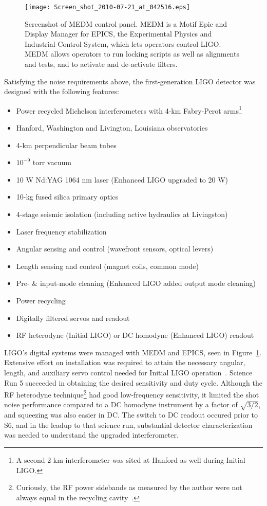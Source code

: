 	\begin{figure}
	\begin{center}
	\texttt{[image: Screen\_shot\_2010-07-21\_at\_042516.eps]}
	\caption{Screenshot of MEDM control panel. MEDM is a Motif Epic and Display Manager for EPICS, the Experimental Physics and Industrial Control System, which lets operators control LIGO. MEDM allows operators to run locking scripts as well as alignments and tests, and to activate and de-activate filters.}
	\label{ScreenshotMEDM}
	\end{center}
	\end{figure}

Satisfying the noise requirements above, the first-generation LIGO detector was designed with the following features:

\begin{itemize}
\item Power recycled Michelson interferometers with 4-km Fabry-Perot arms\footnote{A second 2-km interferometer was sited at Hanford as well during Initial LIGO.}
\item Hanford, Washington and Livington, Louisiana observatories
\item 4-km perpendicular beam tubes
\item $10^{−9}$ torr vacuum
\item 10 W Nd:YAG 1064 nm laser (Enhanced LIGO upgraded to 20 W)
\item 10-kg fused silica primary optics
\item 4-stage seismic isolation (including active hydraulics at Livingston)
\item Laser frequency stabilization
\item Angular sensing and control (wavefront sensors, optical levers)
\item Length sensing and control (magnet coils, common mode)
\item Pre- \& input-mode cleaning (Enhanced LIGO added output mode cleaning)
\item Power recycling
\item Digitally filtered servos and readout
\item RF heterodyne (Initial LIGO) or DC homodyne (Enhanced LIGO) readout
\end{itemize}

LIGO's digital systems were managed with MEDM and EPICS, seen in Figure~\ref{ScreenshotMEDM}.
Extensive effort on installation was required to attain the necessary angular, length, and auxiliary servo control needed for Initial LIGO operation~\cite{ReadoutGWA}.
Science Run 5 succeeded in obtaining the desired sensitivity and duty cycle.
Although the RF heterodyne technique\footnote{Curiously, the RF power sidebands as measured by the author were not always equal in the recycling cavity~\cite{MeadorsHanford2005}.} had good low-frequency sensitivity, it limited the shot noise performance compared to a DC homodyne instrument by a factor of $\sqrt{3/2}$, and squeezing was also easier in DC.
The switch to DC readout occured prior to S6, and in the leadup to that science run, substantial detector characterization was needed to understand the upgraded interferometer.

